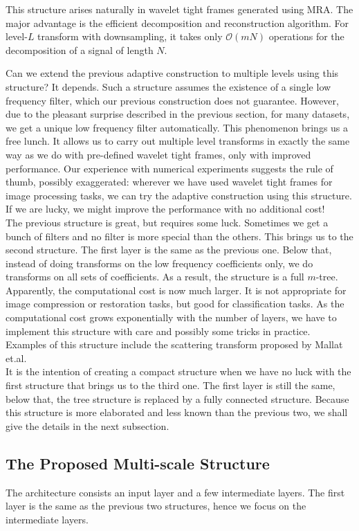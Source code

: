 \documentclass[a4paper]{article}
\begin{document}
This structure arises naturally in wavelet tight frames generated using MRA. The major advantage is the efficient decomposition and reconstruction algorithm. For level-$L$ transform with downsampling, it takes only $\mathcal O(mN)$ operations for the decomposition of a signal of length $N$.
 
Can we extend the previous adaptive construction to multiple levels using this structure? It depends. Such a structure assumes the existence of a single low frequency filter, which our previous construction does not guarantee. However, due to the pleasant surprise described in the previous section, for many datasets, we get a unique low frequency filter automatically. This phenomenon brings us a free lunch. It allows us to carry out multiple level transforms in exactly the same way as we do with pre-defined wavelet tight frames, only with improved performance. Our experience with numerical experiments suggests the rule of thumb, possibly exaggerated: {\color{red}wherever we have used wavelet tight frames for image processing tasks, we can try the adaptive construction using this structure. If we are lucky, we might improve the performance with no additional cost!} \\

The previous structure is great, but requires some luck. Sometimes we get a bunch of filters and no filter is more special than the others. This brings us to the second structure. The first layer is the same as the previous one. Below that, instead of doing transforms on the low frequency coefficients only, we do transforms on all sets of coefficients. As a result, the structure is a full $m$-tree. Apparently, the computational cost is now much larger. It is not appropriate for image compression or restoration tasks, but good for classification tasks. As the computational cost grows exponentially with the number of layers, we have to implement this structure with care and possibly some tricks in practice.  Examples of this structure include the scattering transform proposed by Mallat et.al. \\

It is the intention of creating a compact structure when we have no luck with the first structure that brings us to the third one. The first layer is still the same, below that, the tree structure is replaced by a fully connected structure. Because this structure is more elaborated and less known than the previous two, we shall give the details in the next subsection.

\subsection{The Proposed Multi-scale Structure}
The architecture consists an input layer and a few intermediate layers. The first layer is the same as the previous two structures, hence we focus on the intermediate layers. 
\end{document}
